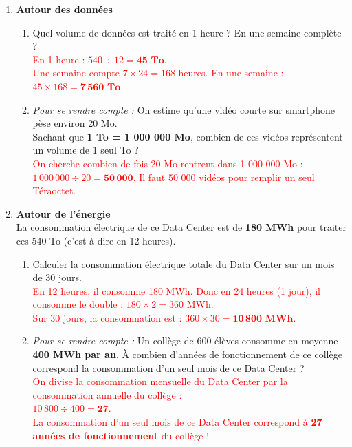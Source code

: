 \documentclass[a4paper]{book}
\begin{document}
{\begin{exercice}
        \begin{enumerate}
            \item \textbf{Autour des données}
            \begin{enumerate}
                \item Quel volume de données est traité en 1 heure ? En une semaine complète ? \\
                \textcolor{red}{En 1 heure : $540 \div 12 = \mathbf{45 \text{ To}}$. \\
                Une semaine compte $7 \times 24 = 168$ heures. En une semaine : $45 \times 168 = \mathbf{7\,560 \text{ To}}$.}
                
                \item \textit{Pour se rendre compte :} On estime qu'une vidéo courte sur smartphone pèse environ 20 Mo. \\
                Sachant que \textbf{1 To = 1 000 000 Mo}, combien de ces vidéos représentent un volume de 1 seul To ? \\
                \textcolor{red}{On cherche combien de fois 20 Mo rentrent dans 1 000 000 Mo : \\ $1\,000\,000 \div 20 = \mathbf{50\,000}$. Il faut 50 000 vidéos pour remplir un seul Téraoctet.}
            \end{enumerate}


\newpage
            
            \item \textbf{Autour de l'énergie} \\
            La consommation électrique de ce Data Center est de \textbf{180 MWh} pour traiter ces 540 To (c'est-à-dire en 12 heures).
            \begin{enumerate}
                \item Calculer la consommation électrique totale du Data Center sur un mois de 30 jours. \\
                \textcolor{red}{En 12 heures, il consomme 180 MWh. Donc en 24 heures (1 jour), il consomme le double : $180 \times 2 = 360$ MWh. \\
                Sur 30 jours, la consommation est : $360 \times 30 = \mathbf{10\,800 \text{ MWh}}$.}
                
                \item \textit{Pour se rendre compte :} Un collège de 600 élèves consomme en moyenne \textbf{400 MWh par an}. À combien d'années de fonctionnement de ce collège correspond la consommation d'un seul mois de ce Data Center ? \\
                \textcolor{red}{On divise la consommation mensuelle du Data Center par la consommation annuelle du collège : \\
                $10\,800 \div 400 = \mathbf{27}$. \\
                La consommation d'un seul mois de ce Data Center correspond à \textbf{27 années de fonctionnement} du collège !}
            \end{enumerate}
        \end{enumerate}
    \end{exercice}



}
\end{document}

